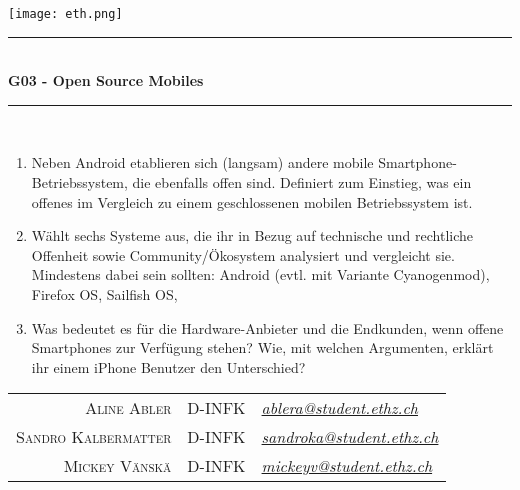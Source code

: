 \begin{titlepage}

	\begin{flushright}
		{\texttt{[image: eth.png]}}
	\end{flushright}
	
	\begin{center}
		\vspace*{2\baselineskip}
		\rule{\linewidth}{0.5mm} \\[3mm]
		\textbf{\huge G03 - Open Source Mobiles} \\
		\rule{\linewidth}{0.5mm} \\
		\vspace{\baselineskip}
	\end{center}
	
	\begin{large}
	
		\begin{enumerate}[leftmargin=*]
		    \item Neben Android etablieren sich (langsam) andere mobile Smartphone-Betriebssystem, die ebenfalls offen sind. Definiert zum Einstieg, was ein offenes im Vergleich zu einem geschlossenen mobilen Betriebssystem ist.
	
		    \item Wählt sechs Systeme aus, die ihr in Bezug auf technische und rechtliche Offenheit sowie Community/Ökosystem analysiert und vergleicht sie. Mindestens dabei sein sollten: Android (evtl{.} mit Variante Cyanogenmod), Firefox OS, Sailfish OS, \textellipsis
	
		    \item Was bedeutet es für die Hardware-Anbieter und die Endkunden, wenn offene Smartphones zur Verfügung stehen? Wie, mit welchen Argumenten, erklärt ihr einem iPhone Benutzer den Unterschied?
		\end{enumerate}
	
		\begin{center}
		
			\vfill
			\begin{tabular}{r@{, }c@{, }l}
				\textsc{Aline Abler} &D-INFK & \href{mailto:ablera@student.ethz.ch}{\emph{ablera@student.ethz.ch}} \\
				\textsc{Sandro Kalbermatter} &D-INFK & \href{mailto:sandroka@student.ethz.ch}{\emph{sandroka@student.ethz.ch}} \\
				\textsc{Mickey Vänskä} & D-INFK & \href{mailto:mickeyv@student.ethz.ch}{\emph{mickeyv@student.ethz.ch}} \\
			\end{tabular}
			\vspace{2\baselineskip}
	

\end{center}
\end{large}
\end{titlepage}
